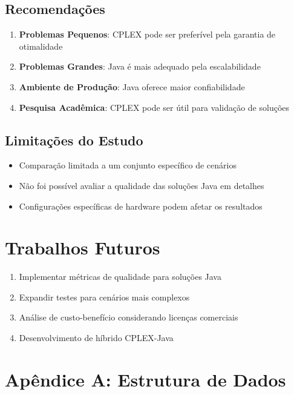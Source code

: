 \documentclass[12pt,a4paper]{article}
\begin{document}
\subsection{Recomendações}

\begin{enumerate}
    \item \textbf{Problemas Pequenos}: CPLEX pode ser preferível pela garantia de otimalidade
    \item \textbf{Problemas Grandes}: Java é mais adequado pela escalabilidade
    \item \textbf{Ambiente de Produção}: Java oferece maior confiabilidade
    \item \textbf{Pesquisa Acadêmica}: CPLEX pode ser útil para validação de soluções
\end{enumerate}

\subsection{Limitações do Estudo}

\begin{itemize}
    \item Comparação limitada a um conjunto específico de cenários
    \item Não foi possível avaliar a qualidade das soluções Java em detalhes
    \item Configurações específicas de hardware podem afetar os resultados
\end{itemize}

\section{Trabalhos Futuros}

\begin{enumerate}
    \item Implementar métricas de qualidade para soluções Java
    \item Expandir testes para cenários mais complexos
    \item Análise de custo-benefício considerando licenças comerciais
    \item Desenvolvimento de híbrido CPLEX-Java
\end{enumerate}

\appendix

\section{Apêndice A: Estrutura de Dados}
\end{document}
